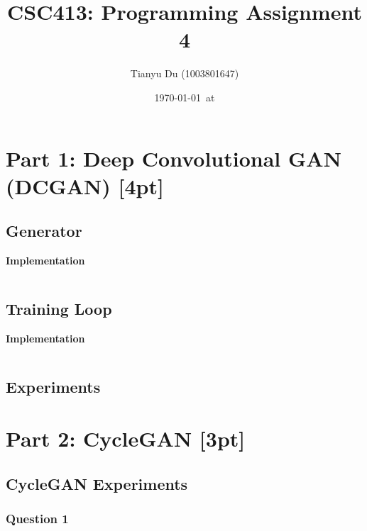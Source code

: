 \documentclass{article}
\title{CSC413: Programming Assignment 4}
\date{\today\ at \currenttime}
\author{Tianyu Du (1003801647)}
\begin{document}
	\maketitle
	\section{Part 1: Deep Convolutional GAN (DCGAN) [4pt]}
	\subsection{Generator}
	\textbf{Implementation}
	\begin{lstlisting}[language=python]
	\end{lstlisting}
	\subsection{Training Loop}
	\textbf{Implementation}
	\begin{lstlisting}[language=python]
	\end{lstlisting}
	\subsection{Experiments}
	
	\section{Part 2: CycleGAN [3pt]}
	\subsection{CycleGAN Experiments}
	\subsubsection{Question 1}
\end{document}
